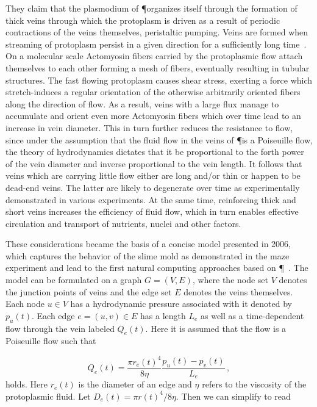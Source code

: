 			They claim that the plasmodium of \P organizes itself through the formation of thick veins through which the protoplasm is driven as a result of periodic contractions of the veins themselves, \ie peristaltic pumping. Veins are formed when streaming of protoplasm persist in a given direction for a sufficiently long time~\cite{nakagaki2000interaction}. On a molecular scale Actomyosin fibers carried by the protoplasmic flow attach themselves to each other forming a mesh of fibers, eventually resulting in tubular structures. The fast flowing protoplasm causes shear stress, exerting a force which stretch-induces a regular orientation of the otherwise arbitrarily oriented fibers along the direction of flow. As a result, veins with a large flux manage to accumulate and orient even more Actomyosin fibers which over time lead to an increase in vein diameter. This in turn further reduces the resistance to flow, since under the assumption that the fluid flow in the veins of \P is a Poiseuille flow, the theory of hydrodynamics dictates that it be proportional to the forth power of the vein diameter and inverse proportional to the vein length. It follows that veins which are carrying little flow either are long and/or thin or happen to be dead-end veins. The latter are likely to degenerate over time as experimentally demonstrated in various experiments. At the same time, reinforcing thick and short veins increases the efficiency of fluid flow, which in turn enables effective circulation and transport of nutrients, nuclei and other factors.

			These considerations became the basis of a concise model presented in 2006, which captures the behavior of the slime mold as demonstrated in the maze experiment and lead to the first natural computing approaches based on \P~\cite{Tero2006115}. The model can be formulated on a graph $G = (V,E)$, where the node set $V$ denotes the junction points of veins and the edge set $E$ denotes the veins themselves. Each node $u \in V$ has a hydrodynamic pressure associated with it denoted by $p_u(t)$. Each edge $e = (u,v) \in E$ has a length $L_e$ as well as a time-dependent flow through the vein labeled $Q_e(t)$. Here it is assumed that the flow is a Poiseuille flow such that

			\begin{equation}
				Q_e(t) = \frac{\pi r_e(t)^4}{ 8 \eta} \frac{p_u(t)-p_v(t)}{L_e}\,,
				\label{eq:flow_initial}
			\end{equation}
			holds. Here $r_e(t)$ is the diameter of an edge and $\eta$ refers to the viscosity of the protoplasmic fluid. Let $D_e(t) = \pi r(t)^4/ 8 \eta$. Then we can simplify  to read

